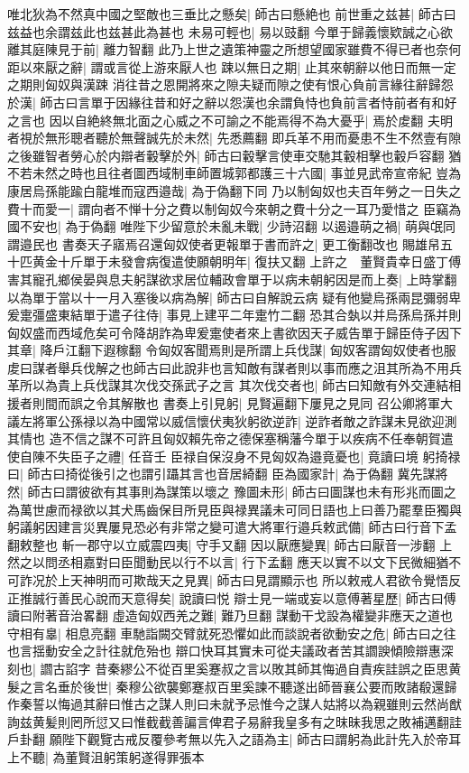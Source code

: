 唯北狄為不然真中國之堅敵也三垂比之懸矣|{
	師古曰懸絶也}
前世重之兹甚|{
	師古曰兹益也余謂兹此也兹甚此為甚也}
未易可輕也|{
	易以豉翻}
今單于歸義懷欵誠之心欲離其庭陳見于前|{
	離力智翻}
此乃上世之遺策神靈之所想望國家雖費不得已者也奈何距以來厭之辭|{
	謂或言從上游來厭人也}
踈以無日之期|{
	止其來朝辭以他日而無一定之期則匈奴與漢踈}
消往昔之恩開將來之隙夫疑而隙之使有恨心負前言緣往辭歸怨於漢|{
	師古曰言單于因緣往昔和好之辭以怨漢也余謂負恃也負前言者恃前者有和好之言也}
因以自絶終無北面之心威之不可諭之不能焉得不為大憂乎|{
	焉於䖍翻}
夫明者視於無形聰者聽於無聲誠先於未然|{
	先悉薦翻}
即兵革不用而憂患不生不然壹有隙之後雖智者勞心於内辯者轂擊於外|{
	師古曰轂擊言使車交馳其轂相擊也轂戶容翻}
猶不若未然之時也且往者圖西域制車師置城郭都護三十六國|{
	事並見武帝宣帝紀}
豈為康居烏孫能踰白龍堆而寇西邉哉|{
	為于偽翻下同}
乃以制匈奴也夫百年勞之一日失之費十而愛一|{
	謂向者不惮十分之費以制匈奴今來朝之費十分之一耳乃愛惜之}
臣竊為國不安也|{
	為于偽翻}
唯陛下少留意於未亂未戰|{
	少詩沼翻}
以遏邉萌之禍|{
	萌與氓同謂邉民也}
書奏天子寤焉召還匈奴使者更報單于書而許之|{
	更工衡翻改也}
賜雄帠五十匹黄金十斤單于未發會病復遣使願朝明年|{
	復扶又翻}
上許之　董賢貴幸日盛丁傅害其寵孔鄉侯晏與息夫躬謀欲求居位輔政會單于以病未朝躬因是而上奏|{
	上時掌翻}
以為單于當以十一月入塞後以病為解|{
	師古曰自解說云病}
疑有他變烏孫兩昆彌弱卑爰疐彊盛東結單于遣子往侍|{
	事見上建平二年疐竹二翻}
恐其合埶以并烏孫烏孫并則匈奴盛而西域危矣可令降胡詐為卑爰疐使者來上書欲因天子威告單于歸臣侍子因下其章|{
	降戶江翻下遐稼翻}
令匈奴客聞焉則是所謂上兵伐謀|{
	匈奴客謂匈奴使者也服䖍曰謀者舉兵伐解之也師古曰此說非也言知敵有謀者則以事而應之沮其所為不用兵革所以為貴上兵伐謀其次伐交孫武子之言}
其次伐交者也|{
	師古曰知敵有外交連結相援者則間而誤之令其解散也}
書奏上引見躬|{
	見賢遍翻下屢見之見同}
召公卿將軍大議左將軍公孫禄以為中國常以威信懷伏夷狄躬欲逆詐|{
	逆詐者敵之詐謀未見欲迎測其情也}
造不信之謀不可許且匈奴賴先帝之德保塞稱藩今單于以疾病不任奉朝賀遣使自陳不失臣子之禮|{
	任音壬}
臣禄自保沒身不見匈奴為邉竟憂也|{
	竟讀曰境}
躬掎禄曰|{
	師古曰掎從後引之也謂引躡其言也音居綺翻}
臣為國家計|{
	為于偽翻}
冀先謀將然|{
	師古曰謂彼欲有其事則為謀策以壞之}
豫圖未形|{
	師古曰圖謀也未有形兆而圖之}
為萬世慮而禄欲以其犬馬齒保目所見臣與禄異議未可同日語也上曰善乃罷羣臣獨與躬議躬因建言災異屢見恐必有非常之變可遣大將軍行邉兵敕武備|{
	師古曰行音下孟翻敕整也}
斬一郡守以立威震四夷|{
	守手又翻}
因以厭應變異|{
	師古曰厭音一涉翻}
上然之以問丞相嘉對曰臣聞動民以行不以言|{
	行下孟翻}
應天以實不以文下民微細猶不可詐况於上天神明而可欺哉天之見異|{
	師古曰見謂顯示也}
所以敕戒人君欲令覺悟反正推誠行善民心說而天意得矣|{
	說讀曰悦}
辯士見一端或妄以意傅著星歷|{
	師古曰傅讀曰附著音治畧翻}
虛造匈奴西羌之難|{
	難乃旦翻}
謀動干戈設為權變非應天之道也守相有辠|{
	相息亮翻}
車馳詣闕交臂就死恐懼如此而談說者欲動安之危|{
	師古曰之往也言揺動安全之計往就危殆也}
辯口快耳其實未可從夫議政者苦其讇諛傾險辯惠深刻也|{
	讇古諂字}
昔秦繆公不從百里奚蹇叔之言以敗其師其悔過自責疾詿誤之臣思黄髮之言名垂於後世|{
	秦穆公欲襲鄭蹇叔百里奚諫不聽遂出師晉襄公要而敗諸殽還歸作秦誓以悔過其辭曰惟古之謀人則曰未就予忌惟今之謀人姑將以為親雖則云然尚猷詢兹黄髪則罔所愆又曰惟截截善諞言俾君子易辭我皇多有之昩昧我思之敗補邁翻詿戶卦翻}
願陛下觀覽古戒反覆參考無以先入之語為主|{
	師古曰謂躬為此計先入於帝耳}
上不聽|{
	為董賢沮躬策躬遂得罪張本}



